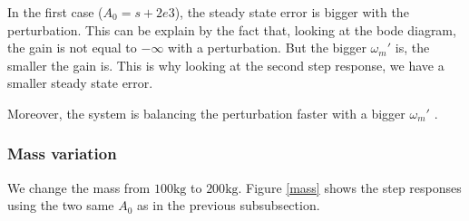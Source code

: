 In the first case ($A_0 = s+2e3$), the steady state error is bigger with the perturbation. This can be explain by the fact that, looking at the bode diagram, the gain is not equal to $- \infty$ with a perturbation.  
But the bigger $\omega_m'$ is, the smaller the gain is. This is why looking at the second step response, we have a smaller steady state error.

Moreover, the system is balancing the perturbation faster with a bigger $\omega_m'$ .

\subsubsection*{Mass variation}

We change the mass from $100\text{kg}$ to $200\text{kg}$. Figure \ref{mass} shows the step responses using the two same $A_0$ as in the previous subsubsection.

